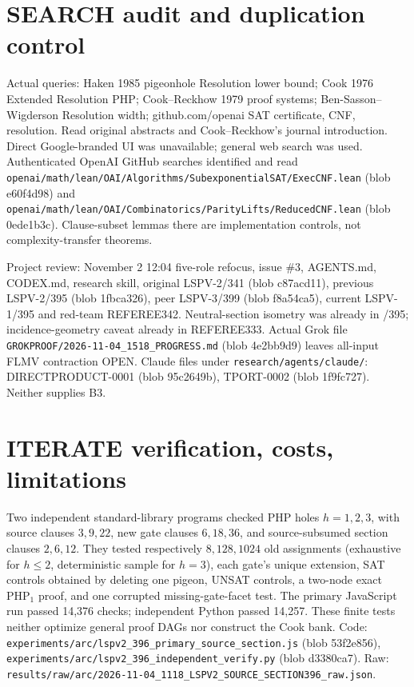 \documentclass{article}
\begin{document}
\section*{SEARCH audit and duplication control}
Actual queries: Haken 1985 pigeonhole Resolution lower bound; Cook 1976 Extended Resolution PHP; Cook--Reckhow 1979 proof systems; Ben-Sasson--Wigderson Resolution width; github.com/openai SAT certificate, CNF, resolution. Read original abstracts and Cook--Reckhow's journal introduction. Direct Google-branded UI was unavailable; general web search was used. Authenticated OpenAI GitHub searches identified and read \texttt{openai/math/lean/OAI/Algorithms/SubexponentialSAT/ExecCNF.lean} (blob e60f4d98) and \texttt{openai/math/lean/OAI/Combinatorics/ParityLifts/ReducedCNF.lean} (blob 0ede1b3c). Clause-subset lemmas there are implementation controls, not complexity-transfer theorems.

Project review: November 2 12:04 five-role refocus, issue \#3, AGENTS.md, CODEX.md, research skill, original LSPV-2/341 (blob c87acd11), previous LSPV-2/395 (blob 1fbca326), peer LSPV-3/399 (blob f8a54ca5), current LSPV-1/395 and red-team REFEREE342. Neutral-section isometry was already in /395; incidence-geometry caveat already in REFEREE333. Actual Grok file \texttt{GROKPROOF/2026-11-04\_1518\_PROGRESS.md} (blob 4e2bb9d9) leaves all-input FLMV contraction OPEN. Claude files under \texttt{research/agents/claude/}: DIRECTPRODUCT-0001 (blob 95c2649b), TPORT-0002 (blob 1f9fc727). Neither supplies B3.
\section*{ITERATE verification, costs, limitations}
Two independent standard-library programs checked PHP holes $h=1,2,3$, with source clauses $3,9,22$, new gate clauses $6,18,36$, and source-subsumed section clauses $2,6,12$. They tested respectively $8,128,1024$ old assignments (exhaustive for $h\le2$, deterministic sample for $h=3$), each gate's unique extension, SAT controls obtained by deleting one pigeon, UNSAT controls, a two-node exact PHP$_1$ proof, and one corrupted missing-gate-facet test. The primary JavaScript run passed 14,376 checks; independent Python passed 14,257. These finite tests neither optimize general proof DAGs nor construct the Cook bank. Code: \texttt{experiments/arc/lspv2\_396\_primary\_source\_section.js} (blob 53f2e856), \texttt{experiments/arc/lspv2\_396\_independent\_verify.py} (blob d3380ca7). Raw: \texttt{results/raw/arc/2026-11-04\_1118\_LSPV2\_SOURCE\_SECTION396\_raw.json}.
\end{document}
